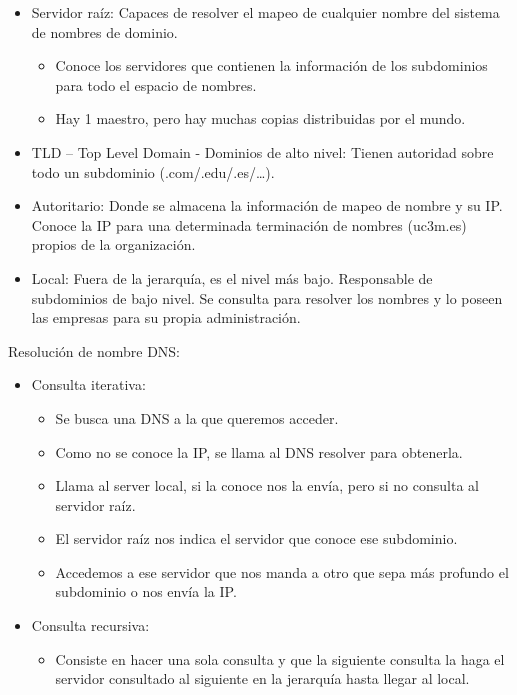 \documentclass[12pt, twoside, openright]{report} %
\begin{document}
    \begin{itemize}
    \item
      Servidor raíz: Capaces de resolver el mapeo de cualquier nombre
      del sistema de nombres de dominio.

      \begin{itemize}
      \item
        Conoce los servidores que contienen la información de los
        subdominios para todo el espacio de nombres.
      \item
        Hay 1 maestro, pero hay muchas copias distribuidas por el mundo.
      \end{itemize}
    \item
      TLD -- Top Level Domain - Dominios de alto nivel: Tienen autoridad
      sobre todo un subdominio (.com/.edu/.es/\ldots).
    \item
      Autoritario: Donde se almacena la información de mapeo de nombre y
      su IP. Conoce la IP para una determinada terminación de nombres
      (uc3m.es) propios de la organización.
    \item
      Local: Fuera de la jerarquía, es el nivel más bajo. Responsable de
      subdominios de bajo nivel. Se consulta para resolver los nombres y
      lo poseen las empresas para su propia administración.
    \end{itemize}

	Resolución de nombre DNS:

    \begin{itemize}
    \item
      Consulta iterativa:

      \begin{itemize}
      \item
        Se busca una DNS a la que queremos acceder.
      \item
        Como no se conoce la IP, se llama al DNS resolver para
        obtenerla.
      \item
        Llama al server local, si la conoce nos la envía, pero si no
        consulta al servidor raíz.
      \item
        El servidor raíz nos indica el servidor que conoce ese
        subdominio.
      \item
        Accedemos a ese servidor que nos manda a otro que sepa más
        profundo el subdominio o nos envía la IP.
      \end{itemize}
    \item
      Consulta recursiva:

      \begin{itemize}
      \item
        Consiste en hacer una sola consulta y que la siguiente consulta
        la haga el servidor consultado al siguiente en la jerarquía
        hasta llegar al local.
      \end{itemize}
    \end{itemize}
\end{document}
